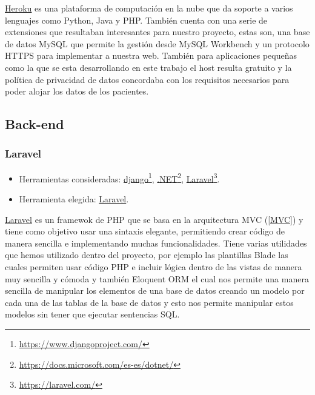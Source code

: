 \href{https://www.heroku.com/}{Heroku} es una plataforma de computación en la nube que da soporte a varios lenguajes como Python, Java y PHP\cite{heroku}. También cuenta con una serie de extensiones que resultaban interesantes para nuestro proyecto, estas son, una base de datos MySQL que permite la gestión desde MySQL Workbench y un protocolo HTTPS para implementar a nuestra web. También para aplicaciones pequeñas como la que se esta desarrollando en este trabajo el host resulta gratuito y la política de privacidad de datos concordaba con los requisitos necesarios para poder alojar los datos de los pacientes.

\subsection{Back-end}

\subsubsection{Laravel}\label{Laravel}
\begin{itemize}
    \item Herramientas consideradas: \href{https://www.djangoproject.com/}{django}\footnote{\href{https://www.djangoproject.com/}{https://www.djangoproject.com/}}, \href{https://docs.microsoft.com/es-es/dotnet/}{.NET}\footnote{\href{https://docs.microsoft.com/es-es/dotnet/}{https://docs.microsoft.com/es-es/dotnet/}}, \href{https://laravel.com/}{Laravel}\footnote{\label{laravelfoot}\href{https://laravel.com/}{https://laravel.com/}}.
	\item Herramienta elegida: \href{https://laravel.com/}{Laravel}.
\end{itemize}

\href{https://laravel.com/}{Laravel} es un framewok de PHP que se basa en la arquitectura MVC (\ref{MVC}) y tiene como objetivo usar una sintaxis elegante, permitiendo crear código de manera sencilla e implementando muchas funcionalidades\cite{laravel}. Tiene varias utilidades que hemos utilizado dentro del proyecto, por ejemplo las plantillas Blade las cuales permiten usar código PHP e incluir lógica dentro de las vistas de manera muy sencilla y cómoda y también Eloquent ORM el cual nos permite una manera sencilla de manipular los elementos de una base de datos creando un modelo por cada una de las tablas de la base de datos y esto nos permite manipular estos modelos sin tener que ejecutar sentencias SQL. 

